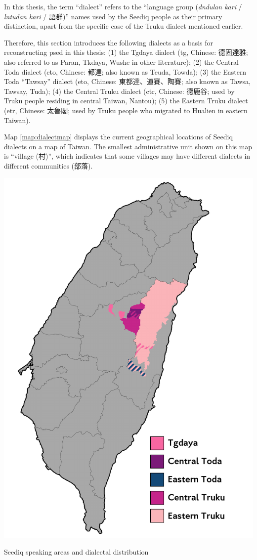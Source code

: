In this thesis, the term ``dialect'' refers to the ``language group (\textit{dndulan kari} / \textit{lntudan kari} / 語群)'' names used by the Seediq people as their primary distinction, apart from the specific case of the Truku dialect mentioned earlier. 

Therefore, this section introduces the following dialects as a basis for reconstructing \acl{psed} in this thesis: (1) the Tgdaya  dialect (\acs{tg}, Chinese: 德固達雅; also referred to as Paran, Tkdaya, Wushe in other literature); (2) the Central Toda dialect (\acs{cto}, Chinese: 都達; also known as Teuda, Towda); (3) the Eastern Toda ``Tawsay'' dialect (\acs{eto}, Chinese: 東都達、道賽、陶賽; also known as Tawsa, Tawsay, Tuda); (4) the Central Truku dialect (\acs{ctr}, Chinese: 德鹿谷; used by Truku people residing in central Taiwan, Nantou); (5) the Eastern Truku dialect (\acs{etr}, Chinese: 太魯閣; used by Truku people who migrated to Hualien in eastern Taiwan).

Map \ref{map:dialectmap} displays the current geographical locations of Seediq dialects on a map of Taiwan. The smallest administrative unit shown on this map is ``village (村)'', which indicates that some villages may have different dialects in different communities (部落).

\begin{map}
    \centering
    \includegraphics[width=1\linewidth]{img/dialectmap.pdf}
    \caption{Seediq speaking areas and dialectal distribution}
    \label{map:dialectmap}
\end{map}

